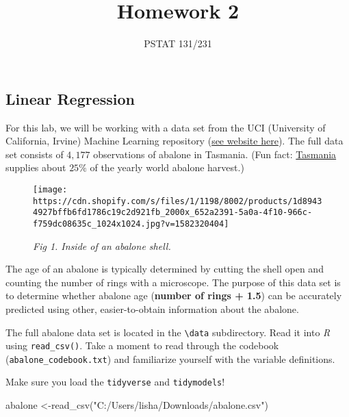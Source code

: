 \documentclass[
]{article}
\title{Homework 2}
\author{PSTAT 131/231}
\date{}
\newenvironment{Shaded}{\begin{snugshade}}{\end{snugshade}}
\newcommand{\FunctionTok}[1]{\textcolor[rgb]{0.00,0.00,0.00}{#1}}
\newcommand{\NormalTok}[1]{#1}
\newcommand{\OtherTok}[1]{\textcolor[rgb]{0.56,0.35,0.01}{#1}}
\newcommand{\StringTok}[1]{\textcolor[rgb]{0.31,0.60,0.02}{#1}}
\begin{document}
\maketitle

{
\setcounter{tocdepth}{2}
\tableofcontents
}
\hypertarget{linear-regression}{%
\subsection{Linear Regression}\label{linear-regression}}

For this lab, we will be working with a data set from the UCI
(University of California, Irvine) Machine Learning repository
(\href{http://archive.ics.uci.edu/ml/datasets/Abalone}{see website
here}). The full data set consists of \(4,177\) observations of abalone
in Tasmania. (Fun fact:
\href{https://en.wikipedia.org/wiki/Tasmania}{Tasmania} supplies about
\(25\%\) of the yearly world abalone harvest.)

\begin{figure}
\centering
\texttt{[image: https://cdn.shopify.com/s/files/1/1198/8002/products/1d89434927bffb6fd1786c19c2d921fb\_2000x\_652a2391-5a0a-4f10-966c-f759dc08635c\_1024x1024.jpg?v=1582320404]}
\caption{\emph{Fig 1. Inside of an abalone shell.}}
\end{figure}

The age of an abalone is typically determined by cutting the shell open
and counting the number of rings with a microscope. The purpose of this
data set is to determine whether abalone age (\textbf{number of rings +
1.5}) can be accurately predicted using other, easier-to-obtain
information about the abalone.

The full abalone data set is located in the
\texttt{\textbackslash{}data} subdirectory. Read it into \emph{R} using
\texttt{read\_csv()}. Take a moment to read through the codebook
(\texttt{abalone\_codebook.txt}) and familiarize yourself with the
variable definitions.

Make sure you load the \texttt{tidyverse} and \texttt{tidymodels}!

\begin{Shaded}
\begin{Highlighting}[]
\NormalTok{abalone }\OtherTok{\textless{}{-}}\FunctionTok{read\_csv}\NormalTok{(}\StringTok{"C:/Users/lisha/Downloads/abalone.csv"}\NormalTok{)}
\end{Highlighting}
\end{Shaded}
\end{document}
